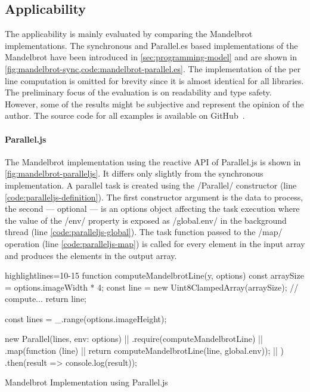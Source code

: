 \subsection{Applicability}
The applicability is mainly evaluated by comparing the Mandelbrot implementations. The synchronous and Parallel.es based implementations of the Mandelbrot have been introduced in \cref{sec:programming-model} and are shown in \cref{fig:mandelbrot-sync,code:mandelbrot-parallel.es}. The implementation of the per line computation is omitted for brevity since it is almost identical for all libraries. The preliminary focus of the evaluation is on readability and type safety. However, some of the results might be subjective and represent the opinion of the author. The source code for all examples is available on GitHub~\cite{Reiser2016}. 

\paragraph{Parallel.js}
The Mandelbrot implementation using the reactive API of Parallel.js is shown in \cref{fig:mandelbrot-paralleljs}. It differs only slightly from the synchronous implementation. A parallel task is created using the \javascriptinline/Parallel/ constructor (line \ref{code:paralleljs-definition}). The first constructor argument is the data to process, the second --- optional ---  is an options object affecting the task execution where the value of the \javascriptinline/env/ property is exposed as \javascriptinline/global.env/ in the background thread (line \ref{code:paralleljs-global}). The task function passed to the \javascriptinline/map/ operation (line \ref{code:paralleljs-map}) is called for every element in the input array and produces the elements in the output array.

\begin{listing}
	\begin{javascriptcode*}{highlightlines={10-15}}
function computeMandelbrotLine(y, options) {
	const arraySize = options.imageWidth * 4;
	const line = new Uint8ClampedArray(arraySize);
	// compute...
	return line;
}

const lines = _.range(options.imageHeight);

new Parallel(lines, {env: options}) |$\label{code:paralleljs-definition}$|
	.require(computeMandelbrotLine)  |$\label{code:paralleljs-require}$|
	.map(function (line) { |$\label{code:paralleljs-map}$|
		return computeMandelbrotLine(line, global.env)); |$\label{code:paralleljs-global}$|
	})
	.then(result => console.log(result));
\end{javascriptcode*}

\caption{Mandelbrot Implementation using Parallel.js}
\label{fig:mandelbrot-paralleljs}
\end{listing}


